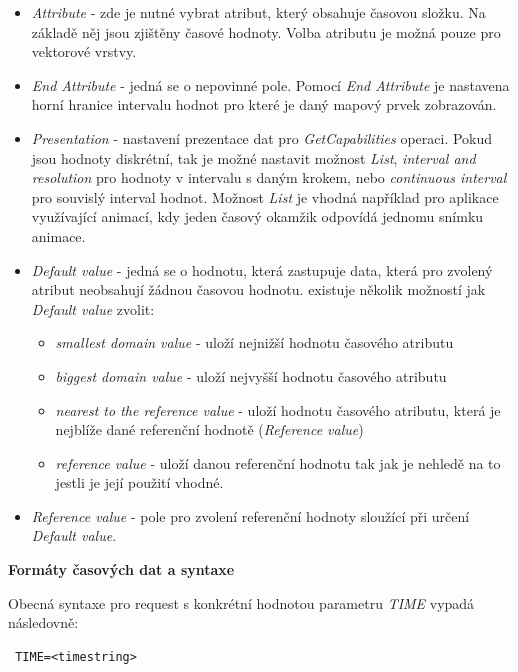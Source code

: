\begin{itemize}
	\item \textit{Attribute} - zde je nutné vybrat atribut, který
obsahuje časovou složku. Na základě něj jsou zjištěny časové
hodnoty. Volba atributu je možná pouze pro vektorové vrstvy.
	\item \textit{End Attribute} - jedná se o nepovinné
pole. Pomocí \textit{End Attribute} je nastavena horní hranice
intervalu hodnot pro které je daný mapový prvek zobrazován.
	\item \textit{Presentation} - nastavení prezentace dat pro
\textit{GetCapabilities} operaci. Pokud jsou hodnoty diskrétní, tak je
možné nastavit možnost \textit{List}, \textit{interval and resolution}
pro hodnoty v intervalu s daným krokem, nebo \textit{continuous
interval} pro souvislý interval hodnot. Možnost \textit{List} je
vhodná například pro aplikace využívající animací, kdy jeden časový
okamžik odpovídá jednomu snímku animace.
	\item \textit{Default value} - jedná se o hodnotu, která
zastupuje data, která pro zvolený atribut neobsahují žádnou časovou
hodnotu. existuje několik možností jak \textit{Default value} zvolit:
	\begin{itemize}
		\item \textit{smallest domain value} - uloží nejnižší
hodnotu časového atributu
		\item \textit{biggest domain value} - uloží nejvyšší
hodnotu časového atributu
		\item \textit{nearest to the reference value} - uloží
hodnotu časového atributu, která je nejblíže dané referenční hodnotě
(\textit{Reference value})
		\item \textit{reference value} - uloží danou
referenční hodnotu tak jak je nehledě na to jestli je její použití
vhodné.
	\end{itemize}
	\item \textit{Reference value} - pole pro zvolení referenční
hodnoty sloužící při určení \textit{Default value}.
\end{itemize}

\bigskip
\noindent \textbf{Formáty časových dat a syntaxe}

\noindent Obecná syntaxe pro request s konkrétní hodnotou parametru
\textit{TIME} vypadá následovně:

\begin{verbatim} TIME=<timestring>
\end{verbatim}

